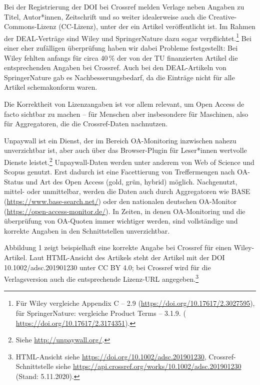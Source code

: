 \documentclass[a4paper,
fontsize=11pt,
oneside,
numbers=noperiodatend,
parskip=half-,
bibliography=totoc,
final
]{scrartcl}
\begin{document}
Bei der Registrierung der DOI bei Crossref melden Verlage neben Angaben
zu Titel, Autor*innen, Zeitschrift und so weiter idealerweise auch die
Creative-Commons-Lizenz (CC-Lizenz), unter der ein Artikel
veröffentlicht ist. Im Rahmen der DEAL-Verträge sind Wiley und
SpringerNature dazu sogar verpflichtet.\footnote{Für Wiley vergleiche
  Appendix C -- 2.9 (\url{https://doi.org/10.17617/2.3027595}), für
  SpringerNature: vergleiche Product Terms -- 3.1.9. (
  \url{https://doi.org/10.17617/2.3174351}).} Bei einer eher zufälligen
überprüfung haben wir dabei Probleme festgestellt: Bei Wiley fehlten
anfangs für circa 40\,\% der von der TU finanzierten Artikel die
entsprechenden Angaben bei Crossref. Auch bei den DEAL-Artikeln von
SpringerNature gab es Nachbesserungsbedarf, da die Einträge nicht für
alle Artikel schemakonform waren.

Die Korrektheit von Lizenzangaben ist vor allem relevant, um Open Access
de facto sichtbar zu machen -- für Menschen aber insbesondere für
Maschinen, also für Aggregatoren, die die Crossref-Daten nachnutzen.

Unpaywall ist ein Dienst, der im Bereich OA-Monitoring inzwischen nahezu
unverzichtbar ist, aber auch über das Browser-Plugin für Leser*innen
wertvolle Dienste leistet.\footnote{Siehe \url{http://unpaywall.org/}.}
Unpaywall-Daten werden unter anderem von Web of Science und Scopus
genutzt. Erst dadurch ist eine Facettierung von Treffermengen nach
OA-Status und Art des Open Access (gold, grün, hybrid) möglich.
Nachgenutzt, mittel- oder unmittelbar, werden die Daten auch durch
Aggregatoren wie BASE (\url{https://www.base-search.net/}) oder den
nationalen deutschen OA-Monitor (\url{https://open-access-monitor.de/}).
In Zeiten, in denen OA-Monitoring und die überprüfung von OA-Quoten
immer wichtiger werden, sind vollständige und korrekte Angaben in den
Schnittstellen unverzichtbar.

Abbildung 1 zeigt beispielhaft eine korrekte Angabe bei Crossref für
einen Wiley-Artikel. Laut HTML-Ansicht des Artikels steht der Artikel
mit der DOI 10.1002/adsc.201901230 unter CC BY 4.0; bei Crossref wird
für die Verlagsversion auch die entsprechende Lizenz-URL
angegeben.\footnote{HTML-Ansicht siehe
  \url{https://doi.org/10.1002/adsc.201901230}, Crossref-Schnittstelle
  siehe \url{https://api.crossref.org/works/10.1002/adsc.201901230}
  (Stand: 5.11.2020).}
\end{document}
